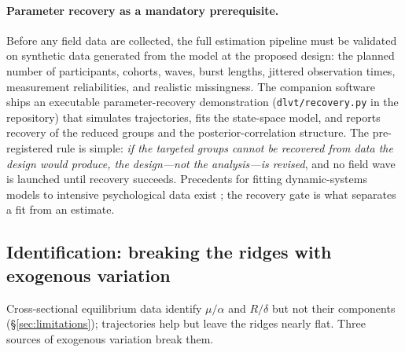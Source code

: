 \paragraph{Parameter recovery as a mandatory prerequisite.}
Before any field data are collected, the full estimation pipeline must be
validated on synthetic data generated from the model at the proposed
design: the planned number of participants, cohorts, waves, burst lengths,
jittered observation times, measurement reliabilities, and realistic
missingness. The companion software ships an executable
parameter-recovery demonstration (\texttt{dlvt/recovery.py} in the
repository) that simulates trajectories, fits the state-space model, and
reports recovery of the reduced groups and the posterior-correlation
structure. The pre-registered rule is simple: \emph{if the targeted groups
cannot be recovered from data the design would produce, the design---not
the analysis---is revised}, and no field wave is launched until recovery
succeeds. Precedents for fitting dynamic-systems models to intensive
psychological data exist \citep{cramer2016depression,veldhuis2020burnout};
the recovery gate is what separates a fit from an estimate.

\subsection{Identification: breaking the ridges with exogenous variation}
\label{sec:emp-identification}

Cross-sectional equilibrium data identify $\mu/\alpha$ and $R/\delta$ but
not their components (\S\ref{sec:limitations}); trajectories help but leave
the ridges nearly flat. Three sources of exogenous variation break them.

